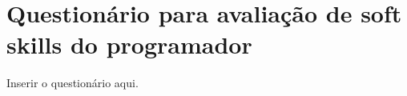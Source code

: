 \documentclass{ppgi}
\begin{document}
\listailustracoes

\listatabelas

\sumario

\elementostextuais




%







\postextual



\apendices

\chapter{Questionário para avaliação de soft skills do programador}
\label{ap:tipi}

Inserir o questionário aqui.
\end{document}
